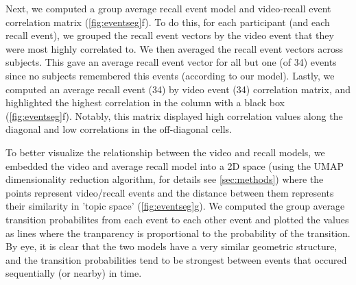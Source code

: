 \documentclass[a4paper,man,natbib,floatsintext]{apa6}
\begin{document}
Next, we computed a group average recall event model and video-recall event correlation matrix (\ref{fig:eventseg}f).  To do this, for each participant (and each recall event), we grouped the recall event vectors by the video event that they were most highly correlated to. We then averaged the recall event vectors across subjects. This gave an average recall event vector for all but one (of 34) events since no subjects remembered this events (according to our model). Lastly, we computed an average recall event (34) by video event (34) correlation matrix, and highlighted the highest correlation in the column with a black box (\ref{fig:eventseg}f). Notably, this matrix displayed high correlation values along the diagonal and low correlations in the off-diagonal cells.

To better visualize the relationship between the video and recall models, we embedded the video and average recall model into a 2D space (using the UMAP dimensionality reduction algorithm, for details see \ref{sec:methods}) where the points represent video/recall events and the distance between them represents their similarity in 'topic space' (\ref{fig:eventseg}g). We computed the group average transition probabilites from each event to each other event and plotted the values as lines where the tranparency is proportional to the probability of the transition.  By eye, it is clear that the two models have a very similar geometric structure, and the transition probabilities tend to be strongest between events that occured sequentially (or nearby) in time.
\end{document}

